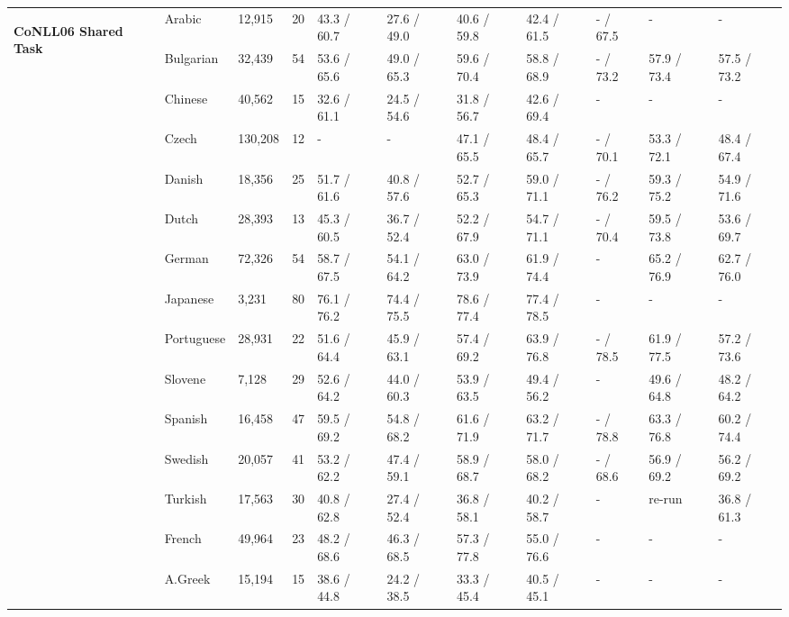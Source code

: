 \begin{landscape}
\begin{table}[ht]
\begin{tabular}{|l|l|l|l|p{2cm}|p{2cm}|p{2cm}|p{2cm}|p{2cm}|p{2cm}|p{2cm}|}
        \hline %
        \multirow{13}{*}{\begin{sideways}\textbf{CoNLL06 Shared Task}\end{sideways}}& Arabic     & 12,915  & 20   & 43.3 / 60.7   & 27.6 / 49.0   & 40.6 / 59.8   & 42.4 / 61.5   & - / 67.5    & -               & -  \\
        & Bulgarian  & 32,439  & 54   & 53.6 / 65.6   & 49.0 / 65.3   & 59.6 / 70.4   & 58.8 / 68.9   & - / 73.2    & 57.9 / 73.4     & 57.5 / 73.2 \\
        & Chinese    & 40,562  & 15   & 32.6 / 61.1   & 24.5 / 54.6   & 31.8 / 56.7   & 42.6 / 69.4   & -           & -               & -           \\
        & Czech      & 130,208 & 12   & -             & -            & 47.1 / 65.5   & 48.4 / 65.7    & - / 70.1    & 53.3 / 72.1     & 48.4 / 67.4 \\
        & Danish     & 18,356  & 25   & 51.7 / 61.6   & 40.8 / 57.6   & 52.7 / 65.3   & 59.0 / 71.1   & - / 76.2    & 59.3 / 75.2     & 54.9 / 71.6 \\
        & Dutch      & 28,393  & 13   & 45.3 / 60.5   & 36.7 / 52.4   & 52.2 / 67.9   & 54.7 / 71.1   & - / 70.4    & 59.5 / 73.8     & 53.6 / 69.7 \\
        & German     & 72,326  & 54   & 58.7 / 67.5   & 54.1 / 64.2   & 63.0 / 73.9   & 61.9 / 74.4   & -           & 65.2 / 76.9     & 62.7 / 76.0 \\
        & Japanese   & 3,231   & 80   & 76.1 / 76.2   & 74.4 / 75.5   & 78.6 / 77.4   & 77.4 / 78.5   & -           & -               & -           \\
        & Portuguese & 28,931  & 22   & 51.6 / 64.4   & 45.9 / 63.1   & 57.4 / 69.2   & 63.9 / 76.8   & - / 78.5    & 61.9 / 77.5     & 57.2 / 73.6 \\
        & Slovene    & 7,128   & 29   & 52.6 / 64.2   & 44.0 / 60.3   & 53.9 / 63.5   & 49.4 / 56.2   & -           & 49.6 / 64.8     & 48.2 / 64.2 \\
        & Spanish    & 16,458  & 47   & 59.5 / 69.2   & 54.8 / 68.2   & 61.6 / 71.9   & 63.2 / 71.7   & - / 78.8    & 63.3 / 76.8     & 60.2 / 74.4 \\
        & Swedish    & 20,057  & 41   & 53.2 / 62.2   & 47.4 / 59.1   & 58.9 / 68.7   & 58.0 / 68.2   & - / 68.6     & 56.9 / 69.2      & 56.2 / 69.2 \\
        & Turkish    & 17,563  & 30   & 40.8 / 62.8   & 27.4 / 52.4   & 36.8 / 58.1   & 40.2 / 58.7   & -           & re-run          & 36.8 / 61.3  \\ \hline %
        & French     & 49,964  & 23   & 48.2 / 68.6   & 46.3 / 68.5   & 57.3 / 77.8   & 55.0 / 76.6   & -           & -               & -        \\
        & A.Greek    & 15,194  & 15   & 38.6 / 44.8   & 24.2 / 38.5   & 33.3 / 45.4  & 40.5 / 45.1    & -           & -               & -        \\ \hline
    \end{tabular}
\end{table}
\end{landscape}
